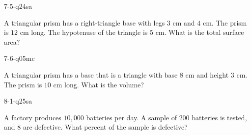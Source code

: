 \begin{practiceQuestion}{7-5-q24}{sa}
\begin{questionText}
A triangular prism has a right-triangle base with legs $3$ cm and $4$ cm. The prism is $12$ cm long. The hypotenuse of the triangle is $5$ cm. What is the total surface area?
\end{questionText}
\end{practiceQuestion}

\begin{practiceQuestion}{7-6-q05}{mc}
\begin{questionText}
A triangular prism has a base that is a triangle with base $8$ cm and height $3$ cm. The prism is $10$ cm long. What is the volume?
\end{questionText}
\end{practiceQuestion}

\begin{practiceQuestion}{8-1-q25}{sa}
\begin{questionText}
A factory produces $10{,}000$ batteries per day. A sample of $200$ batteries is tested, and $8$ are defective. What percent of the sample is defective?
\end{questionText}
\end{practiceQuestion}

